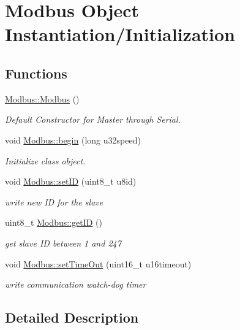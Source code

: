 \hypertarget{group__setup}{\section{Modbus Object Instantiation/\-Initialization}
\label{group__setup}
}
\subsection*{Functions}
\begin{DoxyCompactItemize}
\item 
\hyperlink{group__setup_ga101809cdd4734537bab58dc315a840b4}{Modbus\-::\-Modbus} ()
\begin{DoxyCompactList}\small\item\em Default Constructor for Master through Serial. \end{DoxyCompactList}\item 
void \hyperlink{group__setup_ga475a4fa0fac491307b10c4529ad6d2a0}{Modbus\-::begin} (long u32speed)
\begin{DoxyCompactList}\small\item\em Initialize class object. \end{DoxyCompactList}\item 
void \hyperlink{group__setup_ga9bd497e97ac1777d4f0d4171078d60e0}{Modbus\-::set\-I\-D} (uint8\-\_\-t u8id)
\begin{DoxyCompactList}\small\item\em write new I\-D for the slave \end{DoxyCompactList}\item 
uint8\-\_\-t \hyperlink{group__setup_ga6449894306ff8cc5d4caff09b1b0d1ce}{Modbus\-::get\-I\-D} ()
\begin{DoxyCompactList}\small\item\em get slave I\-D between 1 and 247 \end{DoxyCompactList}\item 
void \hyperlink{group__setup_gaf828190ebe24efb1b3b1957429f3872e}{Modbus\-::set\-Time\-Out} (uint16\-\_\-t u16timeout)
\begin{DoxyCompactList}\small\item\em write communication watch-\/dog timer \end{DoxyCompactList}\end{DoxyCompactItemize}


\subsection{Detailed Description}


